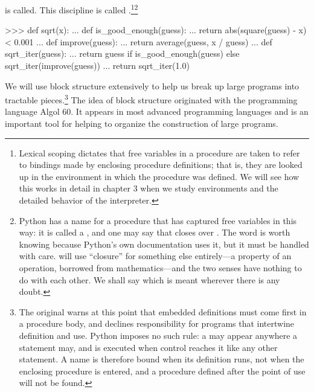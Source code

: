 is called.  This discipline is called .\footnote{Lexical scoping dictates that free variables in a procedure
are taken to refer to bindings made by enclosing procedure definitions; that is,
they are looked up in the environment in which the procedure was defined. We
will see how this works in detail in chapter 3 when we study environments and
the detailed behavior of the interpreter.\label{Footnote 28}}\footnote{Python
has a name for a procedure that has captured free variables in this way: it is
called a , and one may say that  closes
over .  The word is worth knowing because Python's own documentation
uses it, but it must be handled with care.   will use
``closure'' for something else entirely---a property of an operation, borrowed
from mathematics---and the two senses have nothing to do with each other.  We
shall say which is meant wherever there is any doubt.}

\begin{codeBlock}
>>> def sqrt(x):
...     def is_good_enough(guess):
...         return abs(square(guess) - x) < 0.001
...     def improve(guess):
...         return average(guess, x / guess)
...     def sqrt_iter(guess):
...         return guess if is_good_enough(guess) else sqrt_iter(improve(guess))
...     return sqrt_iter(1.0)
\end{codeBlock}

\noindent
We will use block structure extensively to help us break up large programs into
tractable pieces.\footnote{The original warns at this point that embedded
definitions must come first in a procedure body, and declines responsibility for
programs that intertwine definition and use.  Python imposes no such rule: a
 may appear anywhere a statement may, and is executed when control
reaches it like any other statement.  A name is therefore bound when its
definition runs, not when the enclosing procedure is entered, and a procedure
defined after the point of use will not be found.} The idea of block structure
originated with the programming language Algol 60. It appears in most advanced
programming languages and is an important tool for helping to organize the
construction of large programs.

